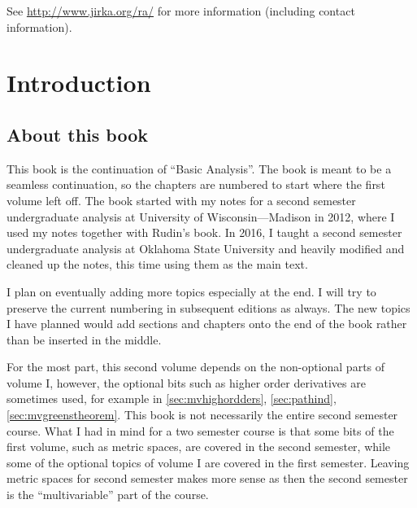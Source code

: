 \documentclass[12pt]{book}
\theoremstyle{plain}
\theoremstyle{remark}
\theoremstyle{definition}
\theoremstyle{exercise}
\theoremstyle{example}
\begin{document}
\bigskip

\noindent
See \url{http://www.jirka.org/ra/} for more information
(including contact information).



\tableofcontents
{}

\newpage


\chapter*{Introduction}


\section*{About this book}

This book is the continuation of ``Basic Analysis''.  The book is meant to
be a seamless continuation, so the chapters are numbered to start where the
first volume left off.  The book started with my notes for a second semester
undergraduate analysis at University of Wisconsin---Madison in 2012, where I
used my notes together with Rudin's book.  In 2016, I taught a second
semester undergraduate analysis at Oklahoma State University and heavily
modified and cleaned up the notes, this time using them as the main text.

I plan on eventually adding more topics especially at the end.  I will try to
preserve the current numbering in subsequent editions as always.  The new
topics I have planned would add sections and chapters onto the end of the
book rather than be inserted in the middle.

For the most part, this second volume
depends on the non-optional parts of volume I,
however, the optional bits such
as higher order derivatives are sometimes used,
for example in \ref{sec:mvhighordders}, \ref{sec:pathind},
\ref{sec:mvgreenstheorem}.
This book is not necessarily
the entire second semester course.  What I had in mind for a two semester
course is that some bits of the first volume, such as metric spaces, are
covered in the second semester, while some of the optional topics of volume
I are covered in the first semester.  Leaving metric spaces for second
semester makes more sense as then the second
semester is the ``multivariable'' part of the course.
\end{document}

